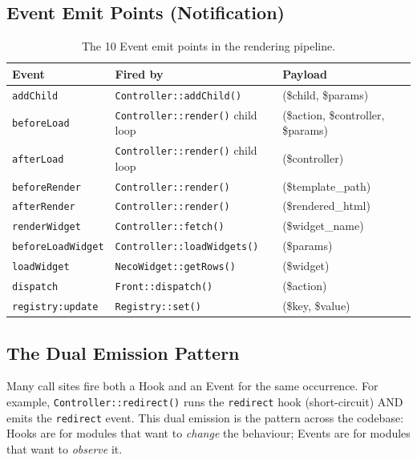 \documentclass[11pt,a4paper]{article}
\begin{document}
\subsection{Event Emit Points (Notification)}

\begin{table}[htbp]
\centering
\caption{The 10 Event emit points in the rendering pipeline.}\label{tab:events}
\small
\begin{tabularx}{\columnwidth}{llX}
\toprule
\textbf{Event} & \textbf{Fired by} & \textbf{Payload} \\
\midrule
\texttt{addChild}        & \texttt{Controller::addChild()}      & (\$child, \$params) \\
\texttt{beforeLoad}      & \texttt{Controller::render()} child loop & (\$action, \$controller, \$params) \\
\texttt{afterLoad}       & \texttt{Controller::render()} child loop & (\$controller) \\
\texttt{beforeRender}    & \texttt{Controller::render()}        & (\$template\_path) \\
\texttt{afterRender}     & \texttt{Controller::render()}        & (\$rendered\_html) \\
\texttt{renderWidget}    & \texttt{Controller::fetch()}         & (\$widget\_name) \\
\texttt{beforeLoadWidget}& \texttt{Controller::loadWidgets()}   & (\$params) \\
\texttt{loadWidget}      & \texttt{NecoWidget::getRows()}       & (\$widget) \\
\texttt{dispatch}        & \texttt{Front::dispatch()}           & (\$action) \\
\texttt{registry:update} & \texttt{Registry::set()}             & (\$key, \$value) \\
\bottomrule
\end{tabularx}
\end{table}

\subsection{The Dual Emission Pattern}

Many call sites fire both a Hook and an Event for the same
occurrence. For example, \texttt{Controller::redirect()} runs the
\texttt{redirect} hook (short-circuit) AND emits the
\texttt{redirect} event. This dual emission is the pattern across
the codebase: Hooks are for modules that want to \emph{change}
the behaviour; Events are for modules that want to \emph{observe}
it.
\end{document}
